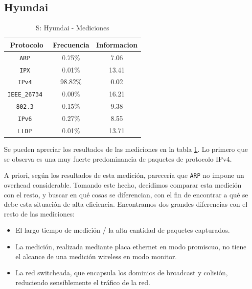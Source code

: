 \documentclass[final,inline,a4paper,narroweqnarray]{ieee}
\begin{document}
  \subsection{Hyundai}

    \begin{table}\begin{center}
      \begin{tabular}{|c|c|c|}
      \hline
      \textbf{Protocolo}   & \textbf{Frecuencia} & \textbf{Informacion}\\ \hline
      \texttt{ARP         }& 0.75\%     & 7.06       \\ \hline
      \texttt{IPX         }& 0.01\%     & 13.41      \\ \hline
      \texttt{IPv4        }& 98.82\%    & 0.02       \\ \hline
      \texttt{IEEE\_26734 }& 0.00\%     & 16.21      \\ \hline
      \texttt{802.3       }& 0.15\%     & 9.38       \\ \hline
      \texttt{IPv6        }& 0.27\%     & 8.55       \\ \hline
      \texttt{LLDP        }& 0.01\%     & 13.71      \\ \hline
      \end{tabular}
      \caption{S: Hyundai - Mediciones}
      \label{hyundai-s-table}
    \end{center}\end{table}

    Se pueden apreciar los resultados de las mediciones en la tabla
    \ref{hyundai-s-table}. Lo primero que se observa es una muy fuerte
    predominancia de paquetes de protocolo IPv4.

    A priori, según los resultados de esta medición, parecería que
    \texttt{ARP} no impone un overhead considerable. Tomando este
    hecho, decidimos comparar esta medición con el resto, y buscar en
    qué cosas se diferencian, con el fin de encontrar a qué se debe
    esta situación de alta eficiencia. Encontramos dos grandes
    diferencias con el resto de las mediciones:

    \begin{itemize}

    \item El largo tiempo de medición / la alta cantidad de paquetes
    capturados.

    \item La medición, realizada mediante placa ethernet en modo
    promiscuo, no tiene el alcance de una medición wireless en modo
    monitor.

    \item La red switcheada, que encapsula los dominios de broadcast y
    colisión, reduciendo sensiblemente el tráfico de la red.

    \end{itemize}
\end{document}
